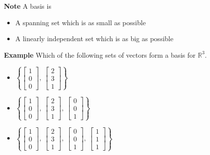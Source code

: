  \begin{frame}[fragile]

\textbf{Note}
 A basis is 
\begin{itemize}
\item A spanning set which is as small as possible
\item A linearly independent set which is as big as possible
\end{itemize}



\textbf{Example}
Which of the following sets of vectors form a basis for $\mathbb R^3$.
\begin{itemize}
\item 
$\left\{ \displaystyle \left[\begin{array}{rrrrrrrr} 
1 \\ 0 \\ 0
\end{array}\right],
\  \displaystyle \left[\begin{array}{rrrrrrrr} 
2 \\ 3 \\ 1
\end{array}\right]\right\}$ 
\item
$\displaystyle 
\left\{  \left[\begin{array}{rrrrrrrr} 
1 \\0 \\0
\end{array}\right]
,\  \left[\begin{array}{rrrrrrrr} 
2 \\ 3 \\ 1 
\end{array}\right] 
,\ \left[\begin{array}{rrrrrrrr} 
0 \\ 0 \\ 1
\end{array}\right]\right\}$
\item 
$\displaystyle 
\left\{ \left[\begin{array}{rrrrrrrr} 
1 \\ 0 \\ 0 
\end{array}\right],
\ \left[\begin{array}{rrrrrrrr} 
2 \\ 3 \\ 1 
\end{array}\right],
\ \left[\begin{array}{rrrrrrrr} 
0 \\ 0 \\ 1 
\end{array}\right],
\ \left[\begin{array}{rrrrrrrr} 
1 \\ 1 \\ 1 
\end{array}\right] \right\}$
\end{itemize}

\end{frame}





